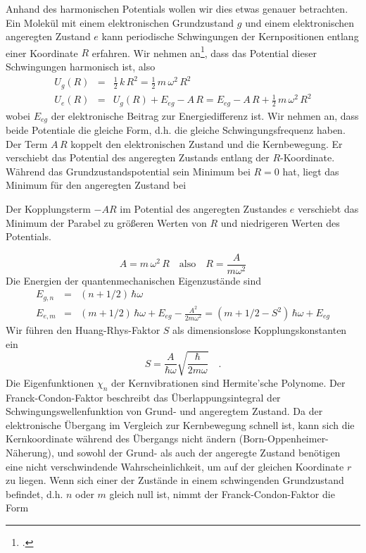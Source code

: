 Anhand des harmonischen Potentials wollen wir dies etwas genauer betrachten. Ein Molekül mit einem elektronischen Grundzustand $g$ und einem elektronischen angeregten Zustand $e$ kann periodische Schwingungen der Kernpositionen entlang einer Koordinate $R$ erfahren. 
Wir nehmen an\footcite{Kuzmany}, dass das Potential dieser Schwingungen harmonisch ist, also
\begin{eqnarray}
 U_g(R) &=& \frac{1}{2} \, k\, R^2 = \frac{1}{2} \, m \, \omega^2 \, R^2 \\
  U_e(R) &=&  U_g(R) + E_{eg} - A \, R = E_{eg}  - A \, R + \frac{1}{2} \, m \, \omega^2 \, R^2 
 \end{eqnarray}
wobei $E_{eg}$ der elektronische Beitrag zur Energiedifferenz ist. Wir nehmen an, dass beide Potentiale die gleiche Form, d.h. die gleiche Schwingungsfrequenz haben. Der Term $A \, R$ koppelt den elektronischen Zustand und die Kernbewegung. Er verschiebt das Potential des angeregten Zustands entlang der $R$-Koordinate. Während das Grundzustandspotential sein Minimum bei $R=0$ hat, liegt das Minimum für den angeregten Zustand bei
%
\begin{marginfigure}[-35mm]
\caption{Der Kopplungsterm $-A R$ im Potential des angeregten Zustandes $e$ verschiebt das Minimum der Parabel zu größeren Werten von $R$ und niedrigeren Werten des Potentials. }
\end{marginfigure}
%
%
\begin{equation}
 A = m \, \omega^2 \,  R	 \quad \text{also} \quad R = \frac{A}{m \omega^2}
\end{equation}
Die Energien der quantenmechanischen Eigenzustände sind 
\begin{eqnarray}
  E_{g, n} &=&  (n + 1/2) \, \hbar \omega  \\
  E_{e, m} &=&  (m + 1/2) \, \hbar \omega  +  E_{eg} - \frac{A^2}{2 m \omega^2} =
   (m + 1/2 - S^2) \, \hbar \omega  +  E_{eg}  \nonumber
\end{eqnarray}
Wir führen den Huang-Rhys-Faktor $S$ als dimensionslose Kopplungskonstanten ein
\begin{equation}
 S = \frac{A}{\hbar \omega} \sqrt{\frac{\hbar}{2 m \omega}} \quad .
\end{equation}
Die Eigenfunktionen $\chi_n$ der Kernvibrationen sind Hermite'sche Polynome. Der Franck-Condon-Faktor beschreibt das Überlappungsintegral der Schwingungswellenfunktion von Grund- und angeregtem Zustand. Da der elektronische Übergang im Vergleich zur Kernbewegung schnell ist, kann sich die Kernkoordinate während des Übergangs nicht ändern (Born-Oppenheimer-Näherung), und sowohl der Grund- als auch der angeregte Zustand benötigen eine nicht verschwindende Wahrscheinlichkeit, um auf der gleichen Koordinate $r$ zu liegen. Wenn sich einer der Zustände in einem schwingenden Grundzustand befindet, d.h. $n$ oder $m$ gleich null ist, nimmt der Franck-Condon-Faktor die Form

